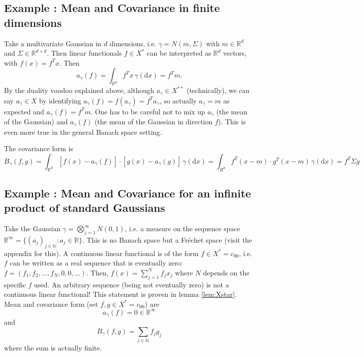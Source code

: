 \documentclass{scrartcl}
\theoremstyle{definition}
\theoremstyle{remark}
\newcommand{\de}{\mathrm d}
\newcommand{\Frechet}{Fr\'echet }
\newcommand{\N}{\mathbb N}
\newcommand{\R}{\mathbb R}
\newcommand*\circled[1]{\tikz[baseline=(char.base)]{
            \node[shape=circle,draw,inner sep=2pt] (char) {#1};}}
\DeclareRobustCommand{\myboxtwo}[2][blue!20]{%
\begin{tcolorbox}[   %
        breakable,
        left=0pt,
        right=0pt,
        top=0pt,
        bottom=0pt,
        colback=#1,
        colframe=#1,
        width=\dimexpr\textwidth\relax, 
        enlarge left by=0mm,
        boxsep=5pt,
        arc=10pt,outer arc=10pt,
        ]
        #2
\end{tcolorbox}
}
\begin{document}
\myboxtwo{\subsection*{Example \circled{1}: Mean and Covariance in finite dimensions}
Take a multivariate Gaussian in $d$ dimensions, i.e. $\gamma = N(m, \Sigma)$ with $m\in\R^d$ and $\Sigma\in\R^{d\times d}$. Then linear functionals $f\in X^*$ can be interpreted as $\R^d$ vectors, with $f(x) = f^Tx$. Then 
\[a_\gamma(f) = \int_{\R^d}f^Tx \, \gamma(\de x) = f^T m.\] By the duality voodoo explained above, although $a_\gamma \in X^{**}$ (technically), we can say $a_\gamma\in X$ by identifying $a_\gamma(f) = f(a_\gamma) = f^T a_\gamma$, so actually $a_\gamma = m$ as expected and $a_\gamma(f) = f^Tm$. One has to be careful not to mix up $a_\gamma$ (the mean of the Gaussian) and $a_\gamma(f)$ (the mean of the Gaussian in direction $f$). This is even more true in the general Banach space setting.

The covariance form is 
\[B_\gamma(f, g) = \int_{\R^d}[f(x)-a_\gamma(f)]\cdot [g(x)-a_\gamma(g)]\, \gamma(\de x) = \int_{R^d}f^T(x-m)\cdot g^T(x-m) \, \gamma(\de x) = f^T\Sigma g\]
}

\myboxtwo{\subsection*{Example \circled{2}: Mean and Covariance for an infinite product of standard Gaussians}
Take the Gaussian $\gamma = \bigotimes_{j=1}^\infty N(0,1)$, i.e. a measure on the sequence space $\R^\infty = \{(a_j)_{j\in\N}: a_j\in \R\}$. This is no Banach space but a \Frechet space (visit the appendix for this). A continuous linear functional is of the form $f\in X^* = c_{00}$, i.e. $f$ can be written as a real sequence that is eventually zero: $f = (f_1, f_2, \ldots, f_N, 0, 0, \ldots)$. Then, $f(x) = \sum_{j=1}^N f_jx_j$ where $N$ depends on the specific $f$ used. An arbitrary sequence (being not eventually zero) is not a continuous linear functional! This statement is proven in lemma \ref{lem:Xstar}. Mean and covariance form (set $f,g\in X^*=c_{00}$) are
\[a_\gamma(f) = 0\in\R^\infty\]
and 
\[B_\gamma(f, g) = \sum_{j\in\N} f_j g_j \]
 where the sum is actually finite.
}
\end{document}
